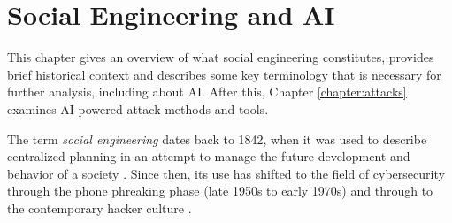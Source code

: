 

    

\chapter{Social Engineering and AI\label{chapter:definition}}
\begin{comment}

Guides:
    - Page limit 1-2 pages
    - Context and terminology (käsitteet), challenges and measurement criteria, values, research question analysis
    - Second to last paragraph contains the research question (RQ) and the results

TODO:
    [ ] 

What to cover:
    - What is cybersecurity and why it's of paramount importance
    - What is social engineering
        - Brief history of social engineering
            - Phishing in 1996 via AOL
    - Attacks, classical social engineering attacks
        - Phishing, vishing, smishing
        - Tailgating
        - Baiting (not always considered SE)
        - Dumpster diving (not always considered SE)
    - Countermeasures, classical
        - User awareness & training programs
        - Company policy & company culture
        - Real-time threat detection
        - Vulnerability detection
    - Typical challenges
    - Motives for cybercrimes
        - Hard(er) to detect?
        - "Easy" wins?

Literature:
    - Defining Social Engineering in Cybersecurity

\end{comment}

This chapter gives an overview of what social engineering constitutes, provides brief historical context and describes some key terminology that is necessary for further analysis, including about AI. After this, Chapter \ref{chapter:attacks}  examines AI-powered attack methods and tools.


The term \textit{social engineering} dates back to 1842, when it was used to describe centralized planning in an attempt to manage the future development and behavior of a society \citep{hatfieldSocialEngineeringCybersecurity2018a}. Since then, its use has shifted to the field of cybersecurity through the phone phreaking phase (late 1950s to early 1970s) and through to the contemporary hacker culture \citep{wangDefiningSocialEngineering2020}.



